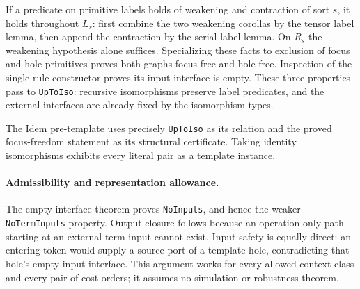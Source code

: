 \par{}


If a predicate on primitive labels holds of weakening and contraction of
sort $s$, it holds throughout $L_s$: first combine the two weakening
corollas by the tensor label lemma, then append the contraction by the
serial label lemma. On $R_s$ the weakening hypothesis alone suffices.
Specializing these facts to exclusion of focus and hole primitives proves
both graphs focus-free and hole-free. Inspection of the single rule
constructor proves its input interface is empty. These three properties
pass to \texttt{UpToIso}: recursive isomorphisms preserve label predicates,
and the external interfaces are already fixed by the isomorphism types.

\par{}


The Idem pre-template uses precisely \texttt{UpToIso} as its relation and
the proved focus-freedom statement as its structural certificate. Taking
identity isomorphisms exhibits every literal pair as a template instance.

\par{}


\paragraph{Admissibility and representation allowance.}
The empty-interface theorem proves \texttt{NoInputs}, and hence the weaker
\texttt{NoTermInputs} property. Output closure follows because an
operation-only path starting at an external term input cannot exist.
Input safety is equally direct: an entering token would supply a source
port of a template hole, contradicting that hole's empty input interface.
This argument works for every allowed-context class and every pair of
cost orders; it assumes no simulation or robustness theorem.

